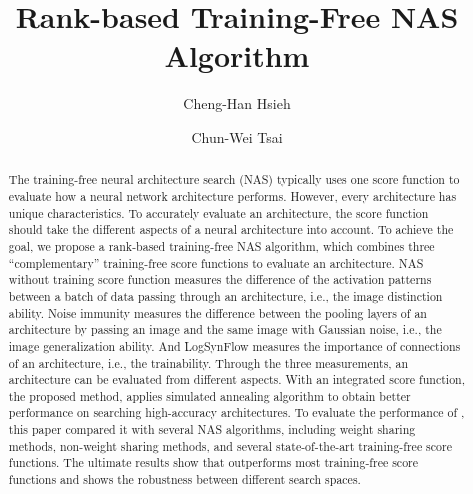 \documentclass[sigconf]{acmart}
\begin{document}
\title{Rank-based Training-Free NAS Algorithm}

\author{Cheng-Han Hsieh}

\author{Chun-Wei Tsai}

\begin{abstract}
    The training-free neural architecture search (NAS) typically uses one  
    score function to evaluate how a neural network architecture performs. 
    However, every architecture has unique characteristics. To accurately 
    evaluate an architecture, the score function should take the different 
    aspects of a neural architecture into account. 
    To achieve the goal, we propose a rank-based training-free NAS algorithm, 
    which combines three ``complementary'' training-free score functions to 
	evaluate an architecture. 
	NAS without training score function measures the difference 
    of the activation patterns between a batch of data passing through an 
    architecture, i.e., the image distinction ability. 
	Noise immunity measures the difference between the pooling layers 
    of an architecture by passing an image and the same image with Gaussian noise, 
    i.e., the image generalization ability. 
	And LogSynFlow measures the importance of connections of an architecture, 
    i.e., the trainability. 
    Through the three measurements, an architecture can be evaluated from 
    different aspects. With an integrated score function, the proposed 
    method, \palg{} applies simulated annealing algorithm to obtain 
    better performance on searching high-accuracy architectures. 
    To evaluate the performance of \palg{}, this paper compared 
    it with several NAS algorithms, including weight sharing methods, 
    non-weight sharing methods, and several state-of-the-art training-free 
    score functions. The ultimate results show that \palg{} outperforms most 
    training-free score functions and shows the robustness between different 
    search spaces. 

\end{abstract}
\maketitle
\end{document}
